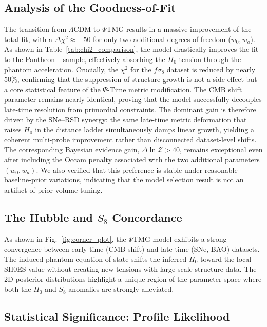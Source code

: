 \documentclass[10pt,twocolumn,secnumarabic,amssymb, nobibnotes, aps, prd, floatfix]{revtex4-2}
\providecommand{\texorpdfstring}[2]{#1}
\begin{document}
\subsection{Analysis of the Goodness-of-Fit}

The transition from $\Lambda$CDM to $\Psi$TMG results in a massive improvement of the total fit, with a $\Delta \chi^2 \approx -50$ for only two additional degrees of freedom ($w_0, w_a$). As shown in Table~\ref{tab:chi2_comparison}, the model drastically improves the fit to the Pantheon+ sample, effectively absorbing the $H_0$ tension through the phantom acceleration. Crucially, the $\chi^2$ for the $f\sigma_8$ dataset is reduced by nearly 50\%, confirming that the suppression of structure growth is not a side effect but a core statistical feature of the $\Psi$-Time metric modification. The CMB shift parameter remains nearly identical, proving that the model successfully decouples late-time resolution from primordial constraints. The dominant gain is therefore driven by the SNe--RSD synergy: the same late-time metric deformation that raises $H_0$ in the distance ladder simultaneously damps linear growth, yielding a coherent multi-probe improvement rather than disconnected dataset-level shifts.
The corresponding Bayesian evidence gain, $\Delta \ln \mathcal{Z} > 40$, remains exceptional even after including the Occam penalty associated with the two additional parameters $(w_0, w_a)$. We also verified that this preference is stable under reasonable baseline-prior variations, indicating that the model selection result is not an artifact of prior-volume tuning.

\subsection{\texorpdfstring{The Hubble and $S_8$ Concordance}{The Hubble and S8 Concordance}}

As shown in Fig.~\ref{fig:corner_plot}, the $\Psi$TMG model exhibits a strong convergence between early-time (CMB shift) and late-time (SNe, BAO) datasets. The induced phantom equation of state shifts the inferred $H_0$ toward the local SH0ES value without creating new tensions with large-scale structure data. The 2D posterior distributions highlight a unique region of the parameter space where both the $H_0$ and $S_8$ anomalies are strongly alleviated.

\subsection{Statistical Significance: Profile Likelihood}
\end{document}
